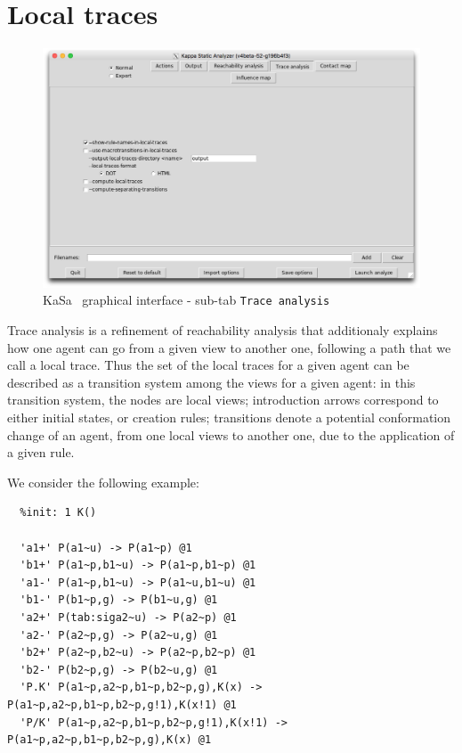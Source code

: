 \documentclass[11pt]{book}
\def\KaSa{\textsf{KaSa}}
\begin{document}
\section{Local traces}
\label{sec:local-traces}


\begin{figure}[htbp]
\centering
\includegraphics[width=12cm,bb=0 0 1904 1208]{img/kasa_3.png}
\caption{\KaSa~ graphical interface - sub-tab \texttt{Trace analysis}}
\label{fig:kasa:3}
\end{figure}

Trace analysis is a refinement of reachability analysis that additionaly explains how one agent can go from a given view to another one, following a path that we call a local trace.
Thus the set of the local traces for a given agent can be described as a transition system among the views for a given agent: in this transition system, the nodes are local views; introduction arrows correspond to either initial states, or creation rules; transitions denote a potential conformation change of an agent, from one local views to another one, due to the application of a given rule.

We consider the following example:
\begin{lstlisting}[language=kappa]
  %init: 1 P()
  %init: 1 K()

  'a1+' P(a1~u) -> P(a1~p) @1
  'b1+' P(a1~p,b1~u) -> P(a1~p,b1~p) @1
  'a1-' P(a1~p,b1~u) -> P(a1~u,b1~u) @1
  'b1-' P(b1~p,g) -> P(b1~u,g) @1
  'a2+' P(tab:siga2~u) -> P(a2~p) @1
  'a2-' P(a2~p,g) -> P(a2~u,g) @1
  'b2+' P(a2~p,b2~u) -> P(a2~p,b2~p) @1
  'b2-' P(b2~p,g) -> P(b2~u,g) @1
  'P.K' P(a1~p,a2~p,b1~p,b2~p,g),K(x) -> P(a1~p,a2~p,b1~p,b2~p,g!1),K(x!1) @1
  'P/K' P(a1~p,a2~p,b1~p,b2~p,g!1),K(x!1) -> P(a1~p,a2~p,b1~p,b2~p,g),K(x) @1
\end{lstlisting}
\end{document}
